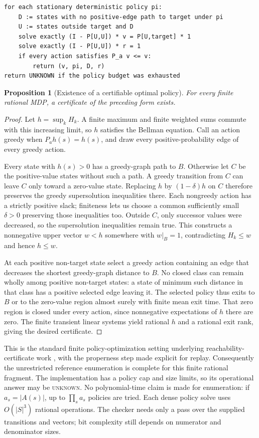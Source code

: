 \documentclass[11pt,letterpaper]{article}
\newtheorem{proposition}[theorem]{Proposition}
\theoremstyle{definition}\newtheorem{definition}[theorem]{Definition}
\theoremstyle{remark}\newtheorem{remark}[theorem]{Remark}
\newcommand{\unknown}{\textsc{unknown}}
\begin{document}
\begin{lstlisting}
for each stationary deterministic policy pi:
    D := states with no positive-edge path to target under pi
    U := states outside target and D
    solve exactly (I - P[U,U]) * v = P[U,target] * 1
    solve exactly (I - P[U,U]) * r = 1
    if every action satisfies P_a v <= v:
        return (v, pi, D, r)
return UNKNOWN if the policy budget was exhausted
\end{lstlisting}
\begin{proposition}[Existence of a certifiable optimal policy]
For every finite rational MDP, a certificate of the preceding form exists.
\end{proposition}
\begin{proof}
Let $h=\sup_k H_k$. A finite maximum and finite weighted sums commute with this increasing limit, so $h$ satisfies the Bellman equation. Call an action greedy when $P_a h(s)=h(s)$, and draw every positive-probability edge of every greedy action.

Every state with $h(s)>0$ has a greedy-graph path to $B$. Otherwise let $C$ be the positive-value states without such a path. A greedy transition from $C$ can leave $C$ only toward a zero-value state. Replacing $h$ by $(1-\delta)h$ on $C$ therefore preserves the greedy supersolution inequalities there. Each nongreedy action has a strictly positive slack; finiteness lets us choose a common sufficiently small $\delta>0$ preserving those inequalities too. Outside $C$, only successor values were decreased, so the supersolution inequalities remain true. This constructs a nonnegative upper vector $w<h$ somewhere with $w|_B=1$, contradicting $H_k\le w$ and hence $h\le w$.

At each positive non-target state select a greedy action containing an edge that decreases the shortest greedy-graph distance to $B$. No closed class can remain wholly among positive non-target states: a state of minimum such distance in that class has a positive selected edge leaving it. The selected policy thus exits to $B$ or to the zero-value region almost surely with finite mean exit time. That zero region is closed under every action, since nonnegative expectations of $h$ there are zero. The finite transient linear systems yield rational $h$ and a rational exit rank, giving the desired certificate.
\end{proof}
This is the standard finite policy-optimization setting underlying reachability-certificate work \cite{farkas}, with the properness step made explicit for replay. Consequently the unrestricted reference enumeration is complete for this finite rational fragment. The implementation has a policy cap and size limits, so its operational answer may be \unknown. No polynomial-time claim is made for enumeration: if $a_s=|A(s)|$, up to $\prod_s a_s$ policies are tried. Each dense policy solve uses $O(|S|^3)$ rational operations. The checker needs only a pass over the supplied transitions and vectors; bit complexity still depends on numerator and denominator sizes.
\end{document}
